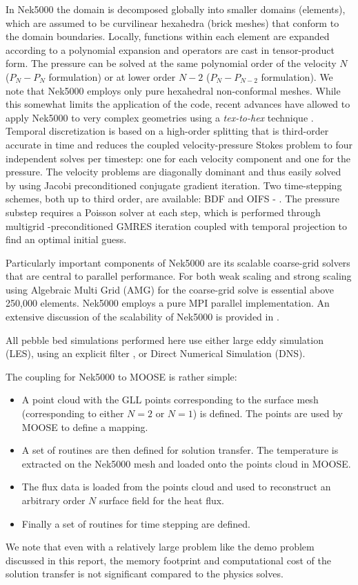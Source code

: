 In Nek5000 the domain is decomposed globally into smaller domains (elements), which are assumed
to be curvilinear hexahedra (brick meshes) that conform to the domain boundaries. Locally, functions within
each element are expanded according to a polynomial expansion and operators are cast in tensor-product
form. The pressure can be solved at the same polynomial order of the velocity $N$ ($P_{N} - P_{N}$ formulation)
or at lower order $N-2$ ($P_{N} - P_{N-2}$ formulation). We note that Nek5000 employs only pure hexahedral
non-conformal meshes. While this somewhat limits the application of the code, recent advances have allowed
to apply Nek5000 to very complex geometries using a \textit{tex-to-hex} technique \cite{yuan2020spectral}.
Temporal discretization is based on a high-order splitting that is third-order accurate in time and
reduces the coupled velocity-pressure Stokes problem to four independent solves per timestep: one for each
velocity component and one for the pressure. The velocity problems are diagonally dominant and thus easily
solved by using Jacobi preconditioned conjugate gradient iteration. Two time-stepping schemes, both up to
third order, are available: BDF and OIFS - \cite{fischer2003implementation}. The pressure substep requires a Poisson solver at each step,
which is performed through multigrid -preconditioned GMRES iteration coupled with temporal projection to find an optimal initial guess.

Particularly important components of Nek5000 are its scalable coarse-grid solvers that are central to
parallel performance. For both weak scaling and strong scaling using Algebraic Multi Grid (AMG) for the
coarse-grid solve is essential above 250,000 elements. Nek5000 employs a pure MPI parallel implementation.
An extensive discussion of the scalability of Nek5000 is provided in \cite{offermans2016strong}.

All pebble bed simulations performed here use either large eddy simulation (LES), using an explicit filter \cite{fischer2001filter}, or Direct Numerical Simulation (DNS).

The coupling for Nek5000 to MOOSE is rather simple:
\begin{itemize}
\item A point cloud with the GLL points corresponding to the surface mesh (corresponding to either $N = 2$ or $N = 1$) is defined. The points are used by MOOSE to define a mapping.
\item A set of routines are then defined for solution transfer. The temperature is extracted on the Nek5000 mesh and loaded onto the points cloud in MOOSE.
\item The flux data is loaded from the points cloud and  used to reconstruct an arbitrary order $N$ surface field for the heat
flux.
\item Finally a set of routines for time stepping are defined.
\end{itemize}
We note that even with a relatively large problem like the demo problem discussed in this report, the memory footprint and computational cost of the solution transfer is not significant compared to the physics solves.

